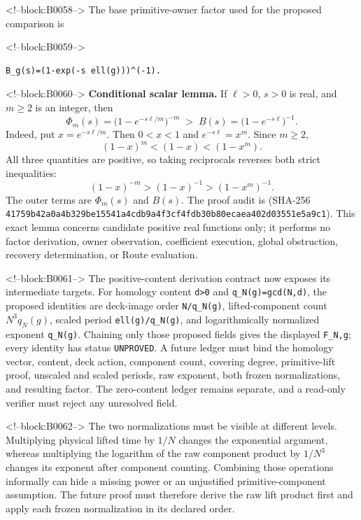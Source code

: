 \documentclass[11pt]{article}
\begin{document}
<!--block:B0058-->
The base primitive-owner factor used for the proposed comparison is

<!--block:B0059-->
\begin{verbatim}
B_g(s)=(1-exp(-s ell(g)))^(-1).
\end{verbatim}

<!--block:B0060-->
\begingroup\sloppy
\textbf{Conditional scalar lemma.}  If \(\ell>0\), \(s>0\) is real, and
\(m\geq2\) is an integer, then
\[
 \Phi_m(s)=\bigl(1-e^{-s\ell/m}\bigr)^{-m}
 \;>\;
 B(s)=\bigl(1-e^{-s\ell}\bigr)^{-1}.
\]
Indeed, put \(x=e^{-s\ell/m}\).  Then \(0<x<1\) and
\(e^{-s\ell}=x^m\).  Since \(m\geq2\),
\[
 (1-x)^m<(1-x)<(1-x^m).
\]
All three quantities are positive, so taking reciprocals reverses both strict
inequalities:
\[
 (1-x)^{-m}>(1-x)^{-1}>(1-x^m)^{-1}.
\]
The outer terms are \(\Phi_m(s)\) and \(B(s)\).  The proof audit is
(SHA-256 \texttt{41759b42\allowbreak{}a0a4b329\allowbreak{}be15541a\allowbreak{}4cdb9a4f\allowbreak{}3cf4fdb3\allowbreak{}0b80ecae\allowbreak{}a402d035\allowbreak{}51e5a9c1}).  This exact lemma concerns candidate positive real
functions only; it performs no factor derivation, owner observation, coefficient
execution, global obstruction, recovery determination, or Route evaluation.
\par\endgroup

<!--block:B0061-->
The positive-content derivation contract now exposes its intermediate
targets. For homology content \texttt{d>0} and
\texttt{q\_N(g)=gcd(N,d)}, the proposed identities are deck-image order
\texttt{N/q\_N(g)}, lifted-component count
\(N^3 q_N(g)\), scaled period \texttt{ell(g)/q\_N(g)}, and logarithmically
normalized exponent \texttt{q\_N(g)}. Chaining only those proposed fields
gives the displayed \texttt{F\_N,g}; every identity has status
\texttt{UNPROVED}. A future ledger must bind the homology vector, content, deck
action, component count, covering degree, primitive-lift proof, unscaled and
scaled periods, raw exponent, both frozen normalizations, and resulting factor.
The zero-content ledger remains separate, and a read-only verifier must reject
any unresolved field.

<!--block:B0062-->
The two normalizations must be visible at different levels. Multiplying
physical lifted time by $1/N$ changes the exponential argument, whereas
multiplying the logarithm of the raw component product by $1/N^3$
changes its exponent after component counting. Combining those
operations informally can hide a missing power or an unjustified
primitive-component assumption. The future proof must therefore derive
the raw lift product first and apply each frozen normalization in its
declared order.
\end{document}
